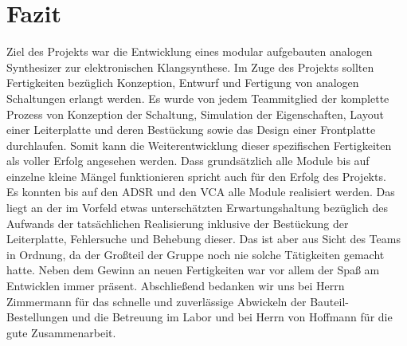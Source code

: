 \chapter{Fazit}\label{ch:fazit}
Ziel des Projekts war die Entwicklung eines modular aufgebauten analogen Synthesizer zur elektronischen Klangsynthese.
Im Zuge des Projekts sollten Fertigkeiten bezüglich Konzeption, Entwurf und Fertigung von analogen Schaltungen erlangt werden.
Es wurde von jedem Teammitglied der komplette Prozess von Konzeption der Schaltung, Simulation der Eigenschaften, Layout einer Leiterplatte und deren Bestückung sowie das Design einer Frontplatte durchlaufen. Somit kann die Weiterentwicklung dieser spezifischen Fertigkeiten als voller Erfolg angesehen werden. Dass grundsätzlich alle Module bis auf einzelne kleine Mängel funktionieren spricht auch für den Erfolg des Projekts.\\
Es konnten bis auf den ADSR und den VCA alle Module realisiert werden. Das liegt an der im Vorfeld etwas unterschätzten Erwartungshaltung bezüglich des Aufwands der tatsächlichen Realisierung inklusive der Bestückung der Leiterplatte, Fehlersuche und Behebung dieser.  
Das ist aber aus Sicht des Teams in Ordnung, da der Großteil der Gruppe noch nie solche Tätigkeiten gemacht hatte.
Neben dem Gewinn an neuen Fertigkeiten war vor allem der Spaß am Entwicklen immer präsent.
Abschließend bedanken wir uns bei Herrn Zimmermann für das schnelle und zuverlässige Abwickeln der Bauteil-Bestellungen und die Betreuung im Labor und bei Herrn von Hoffmann für die gute Zusammenarbeit.

